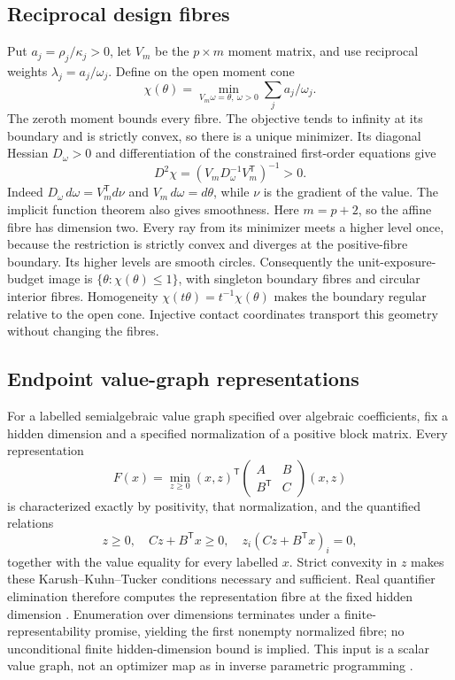 \subsection{Reciprocal design fibres}
Put $a_j=\rho_j/\kappa_j>0$, let $V_m$ be the $p\times m$ moment matrix, and use reciprocal weights $\lambda_j=a_j/\omega_j$. Define on the open moment cone
\[
 \chi(\theta)=\min_{V_m\omega=\theta,\ \omega>0}\sum_j a_j/\omega_j.
\]
The zeroth moment bounds every fibre. The objective tends to infinity at its boundary and is strictly convex, so there is a unique minimizer. Its diagonal Hessian $D_\omega>0$ and differentiation of the constrained first-order equations give
\[
 D^2\chi=(V_mD_\omega^{-1}V_m^{\mathsf T})^{-1}>0.
\]
Indeed $D_\omega\,d\omega=V_m^{\mathsf T}d\nu$ and $V_m\,d\omega=d\theta$, while $\nu$ is the gradient of the value. The implicit function theorem also gives smoothness. Here $m=p+2$, so the affine fibre has dimension two. Every ray from its minimizer meets a higher level once, because the restriction is strictly convex and diverges at the positive-fibre boundary. Its higher levels are smooth circles. Consequently the unit-exposure-budget image is $\{\theta:\chi(\theta)\le1\}$, with singleton boundary fibres and circular interior fibres. Homogeneity $\chi(t\theta)=t^{-1}\chi(\theta)$ makes the boundary regular relative to the open cone. Injective contact coordinates transport this geometry without changing the fibres.

\subsection{Endpoint value-graph representations}
For a labelled semialgebraic value graph specified over algebraic coefficients, fix a hidden dimension and a specified normalization of a positive block matrix. Every representation
\[
 F(x)=\min_{z\ge0}(x,z)^{\mathsf T}
       \begin{pmatrix}A&B\\B^{\mathsf T}&C\end{pmatrix}(x,z)
\]
is characterized exactly by positivity, that normalization, and the quantified relations
\[
 z\ge0,\quad Cz+B^{\mathsf T}x\ge0,\quad
 z_i(Cz+B^{\mathsf T}x)_i=0,
\]
together with the value equality for every labelled $x$. Strict convexity in $z$ makes these Karush--Kuhn--Tucker conditions necessary and sufficient. Real quantifier elimination therefore computes the representation fibre at the fixed hidden dimension \cite{BPR}. Enumeration over dimensions terminates under a finite-representability promise, yielding the first nonempty normalized fibre; no unconditional finite hidden-dimension bound is implied. This input is a scalar value graph, not an optimizer map as in inverse parametric programming \cite{HGL,NORHN}.

